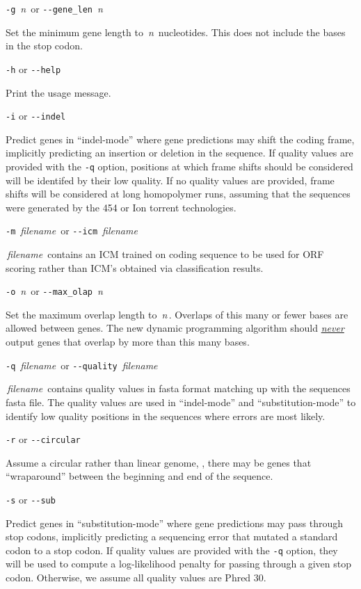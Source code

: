 \documentclass[fleqn,titlepage,11pt]{article}
\def\Desc#1{\,\mbox{\emph{#1}}\,}
\begin{document}
\exdent
  \verb`-g` \Desc{n} \enskip or \enskip \verb`--gene_len` \Desc{n}

  Set the minimum gene length to \Desc{n} nucleotides.  This does not include
  the bases in the stop codon.

\exdent
  \verb`-h` \enskip or \enskip \verb`--help`

  Print the usage message.

\exdent
  \verb`-i` \enskip or \enskip \verb`--indel`

  Predict genes in ``indel-mode'' where gene predictions may shift the
  coding frame, implicitly predicting an insertion or deletion in the
  sequence. If quality values are provided with the \verb`-q` option,
  positions at which frame shifts should be considered will be
  identifed by their low quality. If no quality values are provided,
  frame shifts will be considered at long homopolymer runs, assuming
  that the sequences were generated by the 454 or Ion torrent
  technologies.

\exdent
  \verb`-m` \Desc{filename} \enskip or \enskip \verb`--icm` \Desc{filename}

  \Desc{filename} contains an ICM trained on coding sequence to be used
  for ORF scoring rather than ICM's obtained via classification results.

\exdent
  \verb`-o` \Desc{n} \enskip or \enskip \verb`--max_olap` \Desc{n}

  Set the maximum overlap length to \Desc{n}.  Overlaps of this
  many or fewer bases are allowed between genes.  The new
  dynamic programming algorithm should \underline{\emph{never}}
  output genes that overlap by more than this many bases.

\exdent
  \verb`-q` \Desc{filename} \enskip or \enskip \verb`--quality` \Desc{filename}

  \Desc{filename} contains quality values in fasta format matching up
  with the sequences fasta file. The quality values are used in
  ``indel-mode'' and ``substitution-mode'' to identify low quality
  positions in the sequences where errors are most likely.

\exdent
  \verb`-r` \enskip or \enskip \verb`--circular`

  Assume a circular rather than linear genome, \ie, there may
  be genes that ``wraparound'' between the beginning and end
  of the sequence.

\exdent
  \verb`-s` \enskip or \enskip \verb`--sub`

  Predict genes in ``substitution-mode'' where gene predictions may
  pass through stop codons, implicitly predicting a sequencing error
  that mutated a standard codon to a stop codon. If quality values are
  provided with the \verb`-q` option, they will be used to compute a
  log-likelihood penalty for passing through a given stop
  codon. Otherwise, we assume all quality values are Phred 30.
\end{document}
